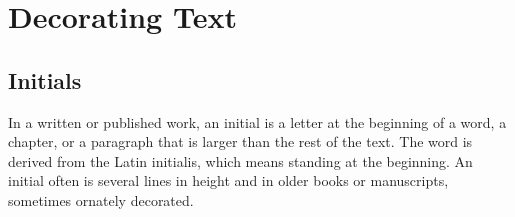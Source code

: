 %

\chapter {Decorating Text}

\section{Initials}


In a written or published work, an initial is a letter at the beginning of a word, a chapter, or a paragraph that is larger than the rest of the text. The word is derived from the Latin initialis, which means standing at the beginning. An initial often is several lines in height and in older books or manuscripts, sometimes ornately decorated.

